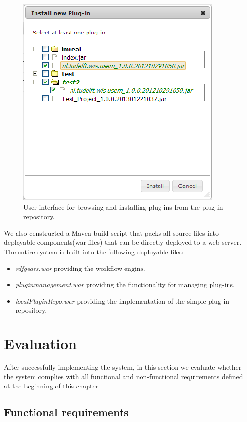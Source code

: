 \begin{figure}[h!]
  \centering
  	\includegraphics[scale=0.6]{plug-in/ui/repo.png}
  \caption{User interface for browsing and installing plug-ins from the plug-in repository.}
  \label{repo_ui}
\end{figure}

We also constructed a Maven build script that packs all source files into deployable components(war files) that can be directly deployed to a web server. The entire system is built into the following deployable files:
\begin{itemize}
	\item \textit{rdfgears.war} providing the workflow engine.
	\item \textit{pluginmanagement.war} providing the functionality for managing plug-ins.
	\item \textit{localPluginRepo.war} providing the implementation of the simple plug-in repository.
\end{itemize}


\section{Evaluation}
\label{sec:evalPlugin}

After successfully implementing the system, in this section we evaluate whether the system complies with all functional and non-functional requirements defined at the beginning of this chapter. 

\subsection{Functional requirements}

